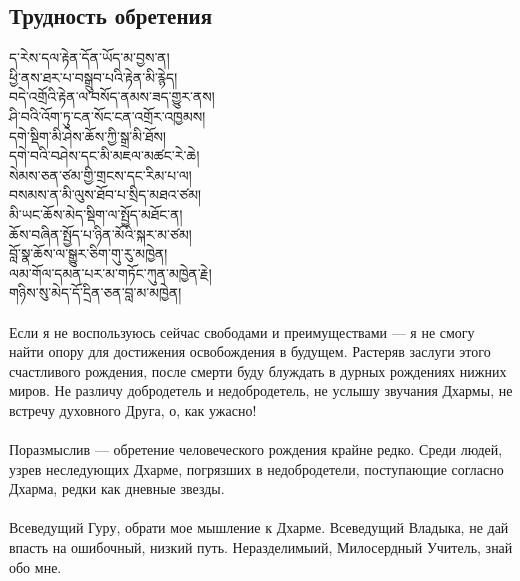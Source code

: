 \subsection*{Трудность обретения}
\ti ད་རེས་དལ་རྟེན་དོན་ཡོད་མ་བྱས་ན།\\
ཕྱི་ནས་ཐར་པ་བསྒྲུབ་པའི་རྟེན་མི་རྙེད།\\
བདེ་འགྲོའི་རྟེན་ལ་བསོད་ནམས་ཟད་གྱུར་ནས།\\
ཤི་བའི་འོག་ཏུ་ངན་སོང་ངན་འགྲོར་འཁྱམས།\\
དགེ་སྡིག་མི་ཤེས་ཆོས་ཀྱི་སྒྲ་མི་ཐོས།\\
དགེ་བའི་བཤེས་དང་མི་མཇལ་མཚང་རེ་ཆེ།\\
སེམས་ཅན་ཙམ་གྱི་གྲངས་དང་རིམ་པ་ལ།\\
བསམས་ན་མི་ལུས་ཐོབ་པ་སྲིད་མཐའ་ཙམ།\\
མི་ཡང་ཆོས་མེད་སྡིག་ལ་སྤྱོད་མཐོང་ན།\\
ཆོས་བཞིན་སྤྱོད་པ་ཉིན་མོའི་སྐར་མ་ཙམ།\\
བློ་སྣ་ཆོས་ལ་སྒྱུར་ཅིག་གུ་རུ་མཁྱེན།\\
ལམ་གོལ་དམན་པར་མ་གཏོང་ཀུན་མཁྱེན་རྗེ།\\
གཉིས་སུ་མེད་དོ་དྲིན་ཅན་བླ་མ་མཁྱེན།\\
\\
\ru
Если я не воспользуюсь сейчас свободами и преимуществами —
я не смогу найти опору для достижения освобождения в будущем.
Растеряв заслуги этого счастливого рождения,
после смерти буду блуждать в дурных рождениях нижних миров.
Не различу добродетель и недобродетель, не услышу звучания Дхармы,
не встречу духовного Друга, о, как ужасно!\\
\\
Поразмыслив — обретение человеческого рождения крайне ред\-ко.
Среди людей, узрев неследующих Дхарме, погрязших в недобродетели,
поступающие согласно Дхарма, редки как дневные звезды.\\
\\
Всеведущий Гуру, обрати мое мышление к Дхарме.
Всеведущий Владыка, не дай впасть на ошибочный, низкий путь.
Нераздели\-мыий, Милосердный Учитель, знай обо мне.
\newpage
